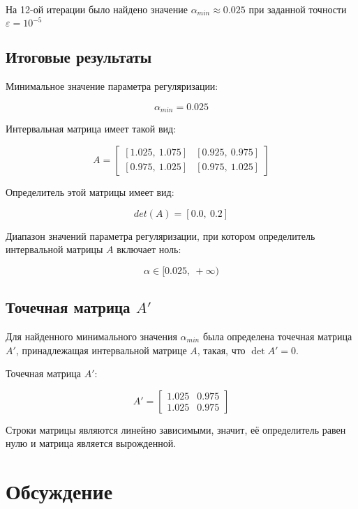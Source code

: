 \documentclass[a4paper,14pt]{article}
\begin{document}
	На 12-ой итерации было найдено значение \(\alpha_{min} \approx 0.025\) при заданной точности \(\varepsilon = 10^{-5}\)
	
	
	\subsection{Итоговые результаты}

	Минимальное значение параметра регуляризации:

	\[\alpha_{min} = 0.025\]

	Интервальная матрица имеет такой вид:

	\[
		A = \begin{bmatrix}
		  [1.025,\ 1.075] & [0.925,\ 0.975] \\
		  [0.975,\ 1.025] & [0.975,\ 1.025]
		\end{bmatrix}
	\]

	Определитель этой матрицы имеет вид:

	\[ det(A) = [0.0,\ 0.2] \]

	Диапазон значений параметра регуляризации, при котором определитель интервальной матрицы \(A\) включает ноль:
	
  	\[ \alpha \in [0.025,\ +\infty) \]

	\subsection{Точечная матрица \( A' \)}

	Для найденного минимального значения \( \alpha_{min} \) была определена
	точечная матрица \( A' \), принадлежащая интервальной матрице \( A \),
	такая, что \( \det A' = 0 \).

	Точечная матрица \( A' \):

	\[
		A' = \begin{bmatrix}
		1.025 & 0.975 \\
		1.025 & 0.975
		\end{bmatrix}
	\]

	Строки матрицы являются линейно зависимыми, значит, её определитель равен нулю и матрица является вырожденной.


	\section{Обсуждение}
\end{document}
